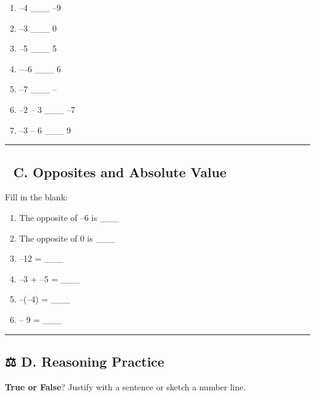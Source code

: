 \documentclass[
  letterpaper,
]{scrrept}
\providecommand{\tightlist}{%
  \setlength{\itemsep}{0pt}\setlength{\parskip}{0pt}}
\begin{document}
\begin{enumerate}
\def\labelenumi{\arabic{enumi}.}
\tightlist
\item
  --4 \_\_\_ --9
\item
  --3 \_\_\_ 0
\item
  \textbar--5\textbar{} \_\_\_ 5
\item
  --\textbar--6\textbar{} \_\_\_ 6
\item
  --7 \_\_\_ --\textbar{}
\item
  --2 -- 3 \_\_\_ --7
\item
  \textbar--3 -- 6\textbar{} \_\_\_ 9
\end{enumerate}

\begin{center}\rule{0.5\linewidth}{0.5pt}\end{center}

\subsection*{🔁 C. Opposites and Absolute
Value}\label{c.-opposites-and-absolute-value}

Fill in the blank:

\begin{enumerate}
\def\labelenumi{\arabic{enumi}.}
\tightlist
\item
  The opposite of --6 is \_\_\_
\item
  The opposite of 0 is \_\_\_
\item
  \textbar--12\textbar{} = \_\_\_
\item
  \textbar--3\textbar{} + \textbar--5\textbar{} = \_\_\_
\item
  --(--4) = \_\_\_
\item
   -- 9\textbar{} = \_\_\_
\end{enumerate}

\begin{center}\rule{0.5\linewidth}{0.5pt}\end{center}

\subsection*{⚖️ D. Reasoning Practice}\label{d.-reasoning-practice}

\textbf{True or False}? Justify with a sentence or sketch a number line.
\end{document}
